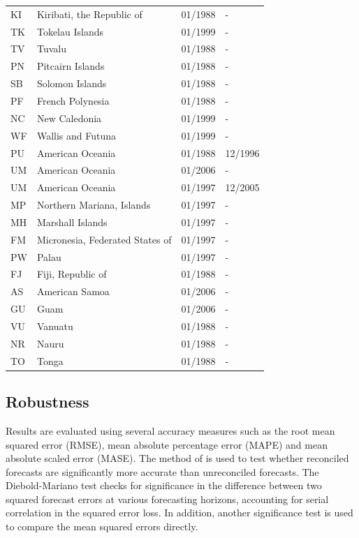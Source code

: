 \begin{footnotesize}
\begin{longtable}{lp{8cm}p{2cm}p{2cm}}
	KI & Kiribati, the Republic of       & 01/1988 & -  \\
	TK & Tokelau Islands                 & 01/1999 & -  \\
	TV & Tuvalu                          & 01/1988 & -  \\
	PN & Pitcairn Islands                & 01/1988 & -  \\
	SB & Solomon Islands                 & 01/1988 & -  \\
	PF & French Polynesia                & 01/1988 & -  \\
	NC & New Caledonia                   & 01/1999 & -  \\
	WF & Wallis and Futuna               & 01/1999 & -  \\
	PU & American Oceania                & 01/1988 & 12/1996  \\
	UM & American Oceania                & 01/2006 & -  \\
	UM & American Oceania                & 01/1997 & 12/2005  \\
	MP & Northern Mariana, Islands       & 01/1997 & -  \\
	MH & Marshall Islands                & 01/1997 & -  \\
	FM & Micronesia, Federated States of & 01/1997 & -  \\
	PW & Palau                           & 01/1997 & -  \\
	FJ & Fiji, Republic of               & 01/1988 & -  \\
	AS & American Samoa                  & 01/2006 & -  \\
	GU & Guam                            & 01/2006 & -  \\
	VU & Vanuatu                         & 01/1988 & -  \\
	NR & Nauru                           & 01/1988 & -  \\
	TO & Tonga                           & 01/1988 & -  \\
\end{longtable}
\end{footnotesize}


\subsection{Robustness}
\label{sec:robust}

Results are evaluated using several accuracy measures such as the root mean squared error (RMSE), mean absolute percentage error (MAPE) and mean absolute scaled error (MASE). The method of \cite{Diebold1995} is used to test whether reconciled forecasts are significantly more accurate than unreconciled forecasts. The Diebold-Mariano test checks for significance in the difference between two squared forecast errors at various forecasting horizons, accounting for serial correlation in the squared error loss. In addition, another significance test is used to compare the mean squared errors directly.


